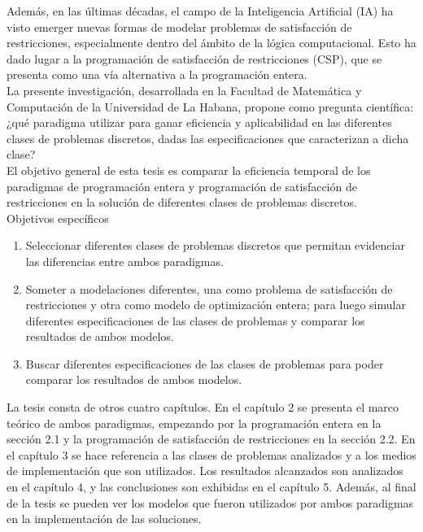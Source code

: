 \documentclass[12pt]{report}
\begin{document}
Además, en las últimas décadas, el campo de la Inteligencia Artificial (IA) ha visto emerger nuevas formas de modelar problemas de satisfacción de restricciones, especialmente dentro del ámbito de la lógica computacional. Esto ha dado lugar a la programación de satisfacción de restricciones (CSP), que se presenta como una vía alternativa a la programación entera.  \\

La presente investigación, desarrollada en la Facultad de Matemática y Computación de la Universidad de La Habana, propone como pregunta científica: ¿qué paradigma utilizar para ganar eficiencia y aplicabilidad en las diferentes clases de problemas discretos, dadas las especificaciones que caracterizan a dicha clase?  \\

El objetivo general de esta tesis es comparar la eficiencia temporal de los paradigmas de programación entera y programación de satisfacción de restricciones en la solución de diferentes clases de problemas discretos. \\


Objetivos específicos
\begin{enumerate}
\item Seleccionar diferentes clases de problemas discretos que permitan evidenciar las diferencias entre ambos paradigmas.
\item Someter a modelaciones diferentes, una como problema de satisfacción de restricciones y otra como modelo de optimización entera; para luego simular diferentes especificaciones de las clases de problemas y comparar los resultados de ambos modelos.
\item Buscar diferentes especificaciones de las clases de problemas para poder comparar los resultados de ambos modelos.\\
\end{enumerate}

La tesis consta de otros cuatro capítulos. En el capítulo 2 se presenta el marco teórico de ambos paradigmas, empezando por la programación entera en la sección 2.1 y la programación de satisfacción de restricciones en la sección 2.2. En el capítulo 3 se hace referencia a las clases de problemas analizados y a los medios de implementación que son utilizados. Los resultados alcanzados son analizados en el capítulo 4, y las conclusiones son exhibidas en el capítulo 5. Además, al final de la tesis se pueden ver los modelos que fueron utilizados por ambos paradigmas en la implementación de las soluciones.\\
\end{document}
